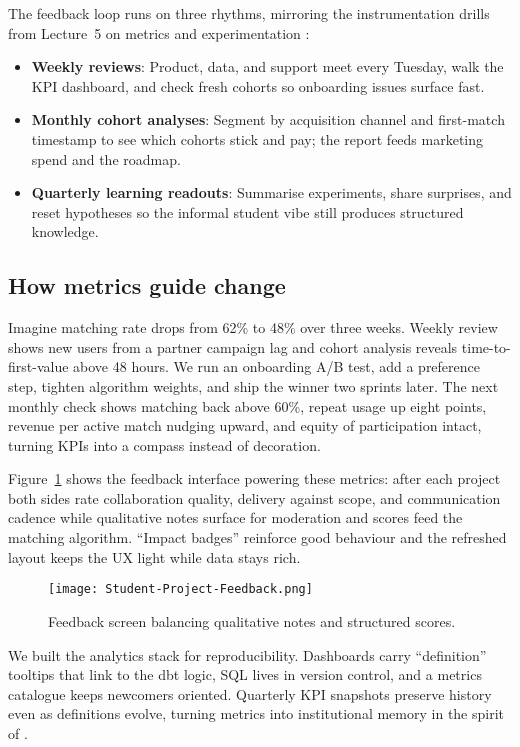 The feedback loop runs on three rhythms, mirroring the instrumentation drills from Lecture~5 on metrics and experimentation \citep{Lecture05}:
\begin{itemize}
    \item \textbf{Weekly reviews}: Product, data, and support meet every Tuesday, walk the KPI dashboard, and check fresh cohorts so onboarding issues surface fast.
    \item \textbf{Monthly cohort analyses}: Segment by acquisition channel and first-match timestamp to see which cohorts stick and pay; the report feeds marketing spend and the roadmap.
    \item \textbf{Quarterly learning readouts}: Summarise experiments, share surprises, and reset hypotheses so the informal student vibe still produces structured knowledge.
\end{itemize}

\subsection*{How metrics guide change}
Imagine matching rate drops from 62\% to 48\% over three weeks. Weekly review shows new users from a partner campaign lag and cohort analysis reveals time-to-first-value above 48 hours. We run an onboarding A/B test, add a preference step, tighten algorithm weights, and ship the winner two sprints later. The next monthly check shows matching back above 60\%, repeat usage up eight points, revenue per active match nudging upward, and equity of participation intact, turning KPIs into a compass instead of decoration.

Figure~\ref{fig:feedback-screen} shows the feedback interface powering these metrics: after each project both sides rate collaboration quality, delivery against scope, and communication cadence while qualitative notes surface for moderation and scores feed the matching algorithm. ``Impact badges'' reinforce good behaviour and the refreshed layout keeps the UX light while data stays rich.

\begin{figure}[H]
  \centering
  \texttt{[image: Student-Project-Feedback.png]}
  \caption{Feedback screen balancing qualitative notes and structured scores.}
  \label{fig:feedback-screen}
\end{figure}

We built the analytics stack for reproducibility. Dashboards carry ``definition'' tooltips that link to the dbt logic, SQL lives in version control, and a metrics catalogue keeps newcomers oriented. Quarterly KPI snapshots preserve history even as definitions evolve, turning metrics into institutional memory in the spirit of \citet{Choudary2016}.
